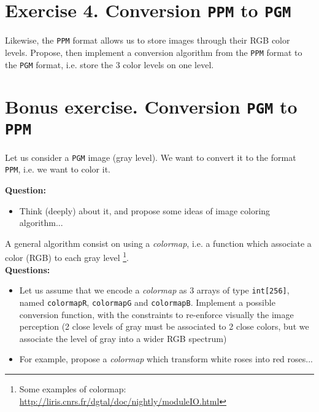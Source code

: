 \documentclass[a4paper, 11pt, english]{article}
\begin{document}
\section*{\bf Exercise 4. \rm Conversion \texttt{PPM} to \texttt{PGM}}

\par Likewise, the \texttt{PPM} format allows us to store images through their RGB color levels. Propose, then implement a conversion algorithm from the \texttt{PPM} format to the \texttt{PGM} format, i.e. store the 3 color levels on one level.


\section*{\bf Bonus exercise. \rm Conversion \texttt{PGM} to \texttt{PPM}}

\par Let us consider a \texttt{PGM} image (gray level). We want to convert it to the format \texttt{PPM}, i.e. we want to color it.

\smallskip
\noindent \textbf{Question:}
\begin{itemize}
	\item Think (deeply) about it, and propose some ideas of image coloring algorithm...
\end{itemize}

\par A general algorithm consist on using a \emph{colormap}, i.e. a function which associate a color (RGB) to each gray level \footnote{Some examples of colormap: \url{http://liris.cnrs.fr/dgtal/doc/nightly/moduleIO.html}}.\\

\smallskip
\noindent \textbf{Questions:}
\begin{itemize}
	\item Let us assume that we encode a \emph{colormap} as 3 arrays of type \texttt{int[256]}, named \texttt{colormapR}, \texttt{colormapG} and \texttt{colormapB}. Implement a possible conversion function, with the constraints to re-enforce visually the image perception (2 close levels of gray must be associated to 2 close colors, but we associate the level of gray into a wider RGB spectrum)
	
	\item For example, propose a \emph{colormap} which transform white roses into red roses...
\end{itemize}
\end{document}
